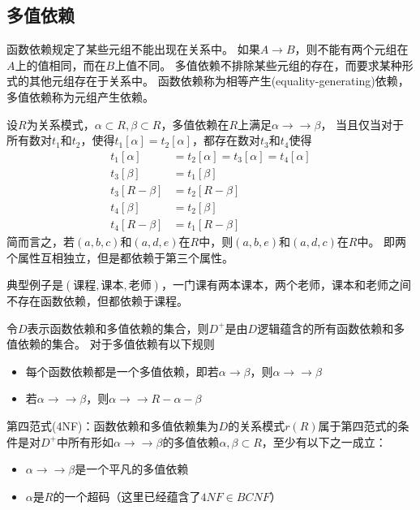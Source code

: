 \subsection{多值依赖}
函数依赖规定了某些元组不能出现在关系中。
如果$A\to B$，则不能有两个元组在$A$上的值相同，而在$B$上值不同。
多值依赖不排除某些元组的存在，而要求某种形式的其他元组存在于关系中。
函数依赖称为相等产生(equality-generating)依赖，多值依赖称为元组产生依赖。
\begin{definition}
设$R$为关系模式，$\alpha\subset R,\beta\subset R$，多值依赖在$R$上满足$\alpha\to\to\beta$，%
当且仅当对于所有数对$t_1$和$t_2$，使得$t_1[\alpha]=t_2[\alpha]$，都存在数对$t_3$和$t_4$使得
\[\begin{aligned}
\displaystyle t_{1}[\alpha ]&= t_{2}[\alpha ]=t_{3}[\alpha ]=t_{4}[\alpha ]\\
\displaystyle t_{3}[\beta ]&= t_{1}[\beta ]\\
\displaystyle t_{3}[R-\beta ]&= t_{2}[R-\beta ]\\
\displaystyle t_{4}[\beta ]&= t_{2}[\beta ]\\
\displaystyle t_{4}[R-\beta ]&= t_{1}[R-\beta ]
\end{aligned}\]
简而言之，若${\displaystyle (a,b,c)}$和${\displaystyle (a,d,e)}$在$R$中，则${\displaystyle (a,b,e)}$和${\displaystyle (a,d,c)}$在$R$中。
即两个属性互相独立，但是都依赖于第三个属性。
\begin{center}
\end{center}
典型例子是$(\text{课程},\text{课本},\text{老师})$，一门课有两本课本，两个老师，课本和老师之间不存在函数依赖，但都依赖于课程。
\end{definition}

令$D$表示函数依赖和多值依赖的集合，则$D^+$是由$D$逻辑蕴含的所有函数依赖和多值依赖的集合。
对于多值依赖有以下规则
\begin{itemize}
	\item 每个函数依赖都是一个多值依赖，即若$\alpha\to\beta$，则$\alpha\to\to\beta$
	\item 若$\alpha\to\to\beta$，则$\alpha\to\to R-\alpha-\beta$
\end{itemize}

第四范式(4NF)：函数依赖和多值依赖集为$D$的关系模式$r(R)$属于第四范式的条件是对$D^+$中所有形如$\alpha\to\to\beta$的多值依赖$\alpha,\beta\subset R$，至少有以下之一成立：
\begin{itemize}
	\item $\alpha\to\to\beta$是一个平凡的多值依赖
	\item $\alpha$是$R$的一个超码（这里已经蕴含了$4NF\in BCNF$）
\end{itemize}